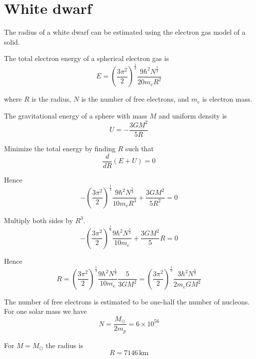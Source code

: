 


\section*{White dwarf}

The radius of a white dwarf can be estimated using the electron gas model of a solid.

\bigskip
The total electron energy of a spherical electron gas is
\begin{equation*}
E=\left(\frac{3\pi^2}{2}\right)^\frac{1}{3}
\frac{9\hbar^2N^\frac{5}{3}}{20m_eR^2}
\end{equation*}

where $R$ is the radius, $N$ is the number of free electrons, and $m_e$ is electron mass.

\bigskip
The gravitational energy of a sphere with mass $M$ and uniform density is
\begin{equation*}
U=-\frac{3GM^2}{5R}
\end{equation*}

Minimize the total energy by finding $R$ such that
\begin{equation*}
\frac{d}{dR}(E+U)=0
\end{equation*}

Hence
\begin{equation*}
-\left(\frac{3\pi^2}{2}\right)^\frac{1}{3}
\frac{9\hbar^2N^\frac{5}{3}}{10m_eR^3}+\frac{3GM^2}{5R^2}=0
\end{equation*}

Multiply both sides by $R^3$.
\begin{equation*}
-\left(\frac{3\pi^2}{2}\right)^\frac{1}{3}
\frac{9\hbar^2N^\frac{5}{3}}{10m_e}+\frac{3GM^2}{5}R=0
\end{equation*}

Hence
\begin{equation*}
R=\left(\frac{3\pi^2}{2}\right)^\frac{1}{3}
\frac{9\hbar^2N^\frac{5}{3}}{10m_e}
\frac{5}{3GM^2}
=\left(\frac{3\pi^2}{2}\right)^\frac{1}{3}
\frac{3\hbar^2N^\frac{5}{3}}{2m_eGM^2}
\tag{1}
\end{equation*}

The number of free electrons is estimated to be one-half the number of nucleons.
For one solar mass we have
\begin{equation*}
N=\frac{M_{\odot}}{2m_p}=6\times10^{56}
\end{equation*}

For $M=M_{\odot}$ the radius is
\begin{equation*}
R=7146\,\text{km}
\end{equation*}


